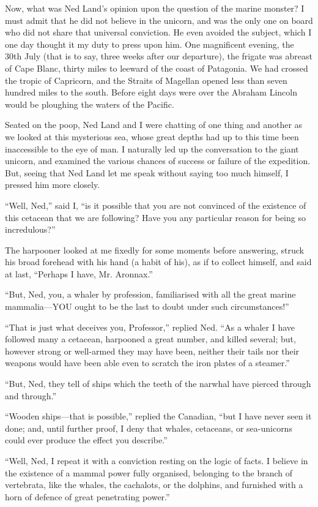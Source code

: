 Now, what was Ned Land's opinion upon the question of the marine monster?
I must admit that he did not believe in the unicorn, and was
the only one on board who did not share that universal conviction.
He even avoided the subject, which I one day thought it my duty
to press upon him.  One magnificent evening, the 30th July (that is
to say, three weeks after our departure), the frigate was abreast
of Cape Blanc, thirty miles to leeward of the coast of Patagonia.
We had crossed the tropic of Capricorn, and the Straits of Magellan
opened less than seven hundred miles to the south.  Before eight
days were over the Abraham Lincoln would be ploughing the waters
of the Pacific.

Seated on the poop, Ned Land and I were chatting of one thing
and another as we looked at this mysterious sea, whose great
depths had up to this time been inaccessible to the eye of man.
I naturally led up the conversation to the giant unicorn, and examined
the various chances of success or failure of the expedition.
But, seeing that Ned Land let me speak without saying too much himself,
I pressed him more closely.

``Well, Ned,'' said I, ``is it possible that you are not convinced
of the existence of this cetacean that we are following?
Have you any particular reason for being so incredulous?''

The harpooner looked at me fixedly for some moments
before answering, struck his broad forehead with his hand
(a habit of his), as if to collect himself, and said at last,
``Perhaps I have, Mr. Aronnax.''

``But, Ned, you, a whaler by profession, familiarised with all
the great marine mammalia---YOU ought to be the last to doubt
under such circumstances!''

``That is just what deceives you, Professor,'' replied Ned.
``As a whaler I have followed many a cetacean, harpooned a great number,
and killed several; but, however strong or well-armed they may
have been, neither their tails nor their weapons would have been
able even to scratch the iron plates of a steamer.''

``But, Ned, they tell of ships which the teeth of the narwhal
have pierced through and through.''

``Wooden ships---that is possible,'' replied the Canadian,
``but I have never seen it done; and, until further proof,
I deny that whales, cetaceans, or sea-unicorns could ever produce
the effect you describe.''

``Well, Ned, I repeat it with a conviction resting on the logic of facts.
I believe in the existence of a mammal power fully organised, belonging to
the branch of vertebrata, like the whales, the cachalots, or the dolphins,
and furnished with a horn of defence of great penetrating power.''

